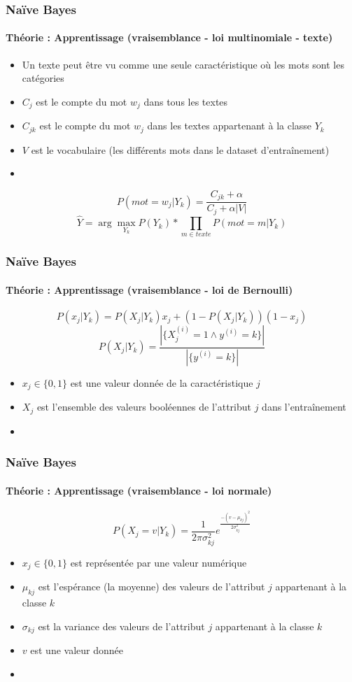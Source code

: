 \documentclass[xcolor=table]{beamer}
\begin{document}
\begin{frame}
	\frametitle{Naïve Bayes}
	\framesubtitle{Théorie : Apprentissage (vraisemblance - loi multinomiale - texte)}
	
	\begin{itemize}
		\item Un texte peut être vu comme une seule caractéristique où les mots sont les catégories
		\item $C_j$ est le compte du mot $w_j$ dans tous les textes
		\item $C_{jk}$ est le compte du mot $w_j$ dans les textes appartenant à la classe $Y_k$
		\item $V$ est le vocabulaire (les différents mots dans le dataset d'entraînement)
		\item {}
	\end{itemize}
	
	\[P(mot = w_j|Y_k) = \frac{C_{jk} + \alpha}{C_j + \alpha |V|}\]
	\[\hat{Y} = \arg\max_{Y_k} P(Y_k) * \prod_{m \in texte} P(mot = m|Y_k)\]
	
\end{frame}

\begin{frame}
	\frametitle{Naïve Bayes}
	\framesubtitle{Théorie : Apprentissage (vraisemblance - loi de Bernoulli)}
	
	\[P(x_j|Y_k) = P(X_j|Y_k) x_j + (1-P(X_j|Y_k)) (1-x_j)\]
	\[P(X_j|Y_k) = \frac{|\{X_j^{(i)} = 1 \wedge y^{(i)} = k\}|}{|\{y^{(i)} = k\}|}\]
	\begin{itemize}
		\item $x_j \in \{0, 1\}$ est une valeur donnée de la caractéristique $j$
		\item $X_j$ est l'ensemble des valeurs booléennes de l'attribut $j$ dans l'entraînement
		\item {}
	\end{itemize}
	
	
\end{frame}

\begin{frame}
	\frametitle{Naïve Bayes}
	\framesubtitle{Théorie : Apprentissage (vraisemblance - loi normale)}
	
	\[P(X_j = v|Y_k) = \frac{1}{2\pi \sigma_{kj}^2} e^\frac{-(v-\mu_{kj})^2}{2 \sigma_{kj}^2}\]
	\begin{itemize}
		\item $x_j \in \{0, 1\}$ est représentée par une valeur numérique
		\item $\mu_{kj}$ est l'espérance (la moyenne) des valeurs de l'attribut $j$ appartenant à la classe $k$
		\item $\sigma_{kj}$ est la variance des valeurs de l'attribut $j$ appartenant à la classe $k$
		\item $v$ est une valeur donnée
		\item {}
	\end{itemize}
	
	
\end{frame}
\end{document}
